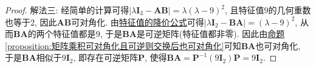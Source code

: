 \documentclass[../../main.tex]{subfiles}%
\begin{document}
\begin{proof}
{\color{blue}解法三:}
经简单的计算可得\(|\lambda\boldsymbol{I}_3 - \boldsymbol{A}\boldsymbol{B}| = \lambda(\lambda - 9)^2\), 且特征值\(9\)的几何重数也等于\(2\), 因此\(\boldsymbol{A}\boldsymbol{B}\)可对角化. 由\hyperref[theorem:特征值的降价公式]{特征值的降价公式}可得\(|\lambda\boldsymbol{I}_2 - \boldsymbol{B}\boldsymbol{A}| = (\lambda - 9)^2\), 从而\(\boldsymbol{B}\boldsymbol{A}\)的两个特征值都是\(9\), 于是\(\boldsymbol{B}\boldsymbol{A}\)是可逆矩阵(特征值都非零). 因此由\hyperref[proposition:矩阵乘积可对角化且可逆则交换后也可对角化]{命题\ref{proposition:矩阵乘积可对角化且可逆则交换后也可对角化}}可知\(\boldsymbol{B}\boldsymbol{A}\)也可对角化, 于是\(\boldsymbol{B}\boldsymbol{A}\)相似于\(9\boldsymbol{I}_2\), 即存在可逆矩阵\(\boldsymbol{P}\), 使得\(\boldsymbol{B}\boldsymbol{A} = \boldsymbol{P}^{-1}(9\boldsymbol{I}_2)\boldsymbol{P} = 9\boldsymbol{I}_2\). 
\end{proof}
\end{document}
